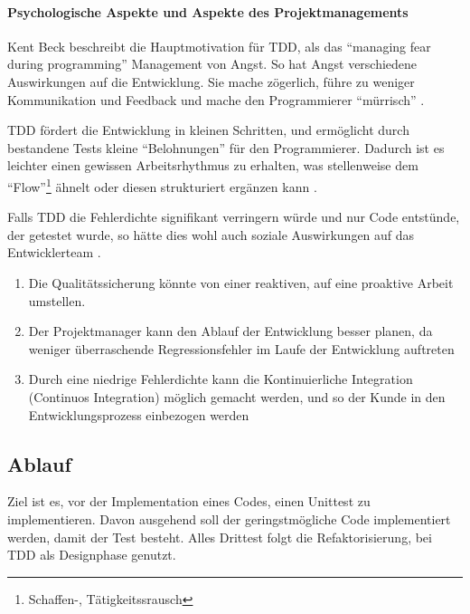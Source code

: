   \paragraph{Psychologische Aspekte und Aspekte des Projektmanagements}
  
  Kent Beck beschreibt die Hauptmotivation für TDD, als das "`managing fear during programming"' Management von Angst. So hat Angst verschiedene Auswirkungen auf die Entwicklung. Sie mache zögerlich, führe zu weniger Kommunikation und Feedback und mache den Programmierer "`mürrisch"' \citep[S. xi]{beck_test_2002}.
  
  TDD fördert die Entwicklung in kleinen Schritten, und ermöglicht durch bestandene Tests kleine "`Belohnungen"' für den Programmierer. Dadurch ist es leichter einen gewissen Arbeitsrhythmus zu erhalten, was stellenweise dem "`Flow"'\footnote{Schaffen-, Tätigkeitssrausch}  ähnelt oder diesen strukturiert ergänzen kann \citep{roger_brown_test_2008}.
  
  Falls TDD die Fehlerdichte signifikant verringern würde und nur Code entstünde, der getestet wurde, so hätte dies wohl auch soziale Auswirkungen auf das Entwicklerteam \citep[S. x]{beck_test_2002}. 
  \begin{enumerate}
   \item Die Qualitätssicherung könnte von einer reaktiven, auf eine proaktive Arbeit umstellen.
   \item Der Projektmanager kann den Ablauf der Entwicklung besser planen, da weniger überraschende Regressionsfehler im Laufe der Entwicklung auftreten
   \item Durch eine niedrige Fehlerdichte kann die Kontinuierliche Integration (Continuos Integration) möglich gemacht werden, und so der Kunde in den Entwicklungsprozess einbezogen werden
  \end{enumerate}
 
  
  
\subsection{Ablauf}
  Ziel ist es, vor der Implementation eines Codes, einen Unittest zu implementieren. Davon ausgehend soll der geringstmögliche Code implementiert werden, damit der Test besteht. Alles Drittest folgt die Refaktorisierung, bei TDD als Designphase genutzt.
  
